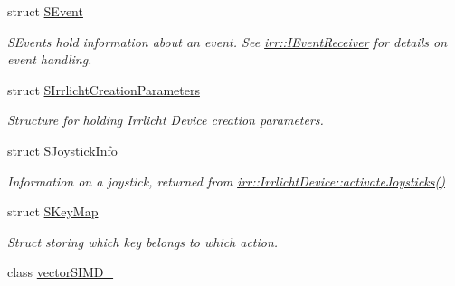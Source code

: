 \begin{DoxyCompactItemize}
struct \hyperlink{structirr_1_1SEvent}{S\+Event}
\begin{DoxyCompactList}\small\item\em S\+Events hold information about an event. See \hyperlink{classirr_1_1IEventReceiver}{irr\+::\+I\+Event\+Receiver} for details on event handling. \end{DoxyCompactList}\item 
struct \hyperlink{structirr_1_1SIrrlichtCreationParameters}{S\+Irrlicht\+Creation\+Parameters}
\begin{DoxyCompactList}\small\item\em Structure for holding Irrlicht Device creation parameters. \end{DoxyCompactList}\item 
struct \hyperlink{structirr_1_1SJoystickInfo}{S\+Joystick\+Info}
\begin{DoxyCompactList}\small\item\em Information on a joystick, returned from \hyperlink{classirr_1_1IrrlichtDevice_af06f8d2c4fdffd1f879e46685bcbc6e3}{irr\+::\+Irrlicht\+Device\+::activate\+Joysticks()} \end{DoxyCompactList}\item 
struct \hyperlink{structirr_1_1SKeyMap}{S\+Key\+Map}
\begin{DoxyCompactList}\small\item\em Struct storing which key belongs to which action. \end{DoxyCompactList}\item 
class \hyperlink{classirr_1_1vectorSIMD__32}{vector\+S\+I\+M\+D\+\_}
\end{DoxyCompactItemize}
